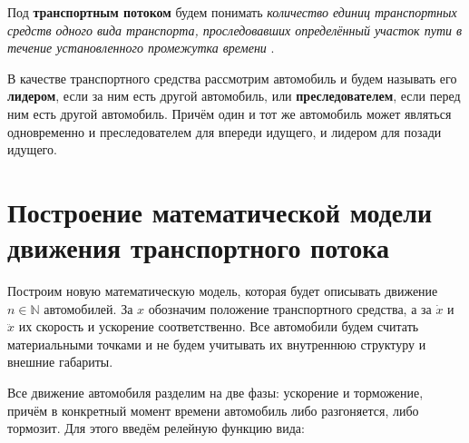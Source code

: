 \documentclass[12pt, a4paper]{extarticle}
\numberwithin{equation}{section}
\numberwithin{figure}{section}
\begin{document}
Под \textbf{транспортным потоком} будем понимать {\it количество единиц транспортных средств одного вида транспорта, проследовавших определённый участок пути в течение установленного промежутка времени} \cite{TrafficFlow}.

В качестве транспортного средства рассмотрим автомобиль и будем называть его \textbf{лидером}, если за ним есть другой автомобиль, или \textbf{преследователем}, если перед ним есть другой автомобиль. Причём один и тот же автомобиль может являться одновременно и преследователем для впереди идущего, и лидером для позади идущего. 

\section{Построение математической модели движения транспортного потока}

Построим новую математическую модель, которая будет описывать движение $n \in \mathbb{N}$ автомобилей. За $x$ обозначим положение транспортного средства, а за $\dot{x}$ и $\ddot{x}$ их скорость и ускорение соответственно. Все автомобили будем считать материальными точками и не будем учитывать их внутреннюю структуру и внешние габариты.

Все движение автомобиля разделим на две фазы: ускорение и торможение, причём в конкретный момент времени автомобиль либо разгоняется, либо тормозит. Для этого введём релейную функцию вида:
\end{document}
